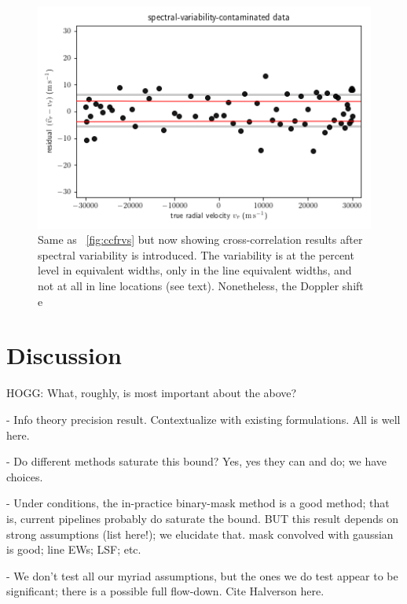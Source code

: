 \documentclass[modern]{aastex631}
\newcommand{\figref}[1]{\figurename~\ref{#1}}
\begin{document}
\begin{figure}[tp]
  \begin{mdframed}
    \begin{center}
    \includegraphics[width=\textwidth]{../notebook/variable.png}
    \end{center}
    \caption{Same as \figref{fig:ccfrvs} but now showing cross-correlation results after spectral variability is introduced. The variability is at the percent level in equivalent widths, only in the line equivalent widths, and not at all in line locations (see text). Nonetheless, the Doppler shift e\label{fig:variable}}
  \end{mdframed}
\end{figure}

\section{Discussion}\label{sec:discussion}

HOGG: What, roughly, is most important about the above?

- Info theory precision result. Contextualize with existing formulations. All is well here.

- Do different methods saturate this bound? Yes, yes they can and do; we have choices.

- Under conditions, the in-practice binary-mask method is a good method; that is, current pipelines probably do saturate the bound. BUT this result depends on strong assumptions (list here!); we elucidate that. mask convolved with gaussian is good; line EWs; LSF; etc.

- We don't test all our myriad assumptions, but the ones we do test appear to be significant; there is a possible full flow-down. Cite Halverson here.
\end{document}
